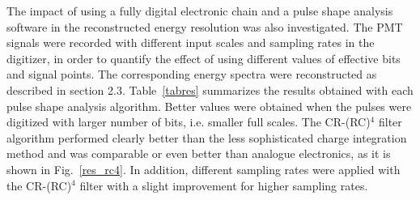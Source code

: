 \documentclass[review,number,sort&compress]{elsarticle}
\begin{document}
The impact of using a fully digital electronic chain and a pulse shape analysis software in the reconstructed energy resolution was also investigated. The PMT signals were recorded with different input scales and sampling rates in the digitizer, in order to quantify the effect of using different values of effective bits and signal points. The corresponding energy spectra were reconstructed as described in section 2.3. Table~\ref{tabres} summarizes the results obtained with each pulse shape analysis algorithm. Better values were obtained when the pulses were digitized with larger number of bits, i.e. smaller full scales. The CR-(RC)$^4$ filter algorithm performed clearly better than the less sophisticated charge integration method and was comparable or even better than analogue electronics, as it is shown in Fig.~\ref{res_rc4}. 
In addition, different sampling rates were applied with the CR-(RC)$^4$ filter with a slight improvement for higher sampling rates.
  
\end{document}

